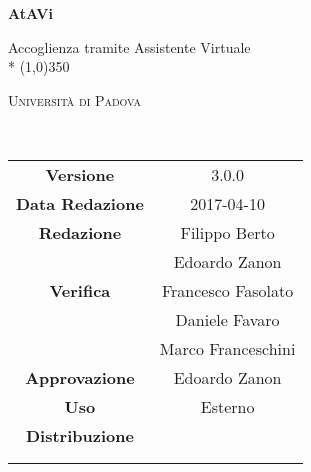 \documentclass[a4paper,12pt]{article}
\date{2017/04/10}
\begin{document}
	\begin{titlepage}
		\centering
		{\huge\bfseries AtAVi\par}
		Accoglienza tramite Assistente Virtuale \\*
		\line(1,0){350} \\
		{\scshape\LARGE Università di Padova \par}
		\vspace{1cm}
		{\scshape\Large \pianodiprogettoRQ\ \par}
		\logo
		\newpage
		\begin{tabular}{c|c}
			{\hfill \textbf{Versione}} 			& 3.0.0			\\ 
			{\hfill\textbf{Data Redazione}} 	& 2017-04-10 		\\ 
			{\hfill\textbf{Redazione}} 			& Filippo Berto \\ & Edoardo Zanon \\
			{\hfill\textbf{Verifica}} 			& Francesco Fasolato \\ & Daniele Favaro \\ & Marco Franceschini \\ 
			{\hfill\textbf{Approvazione}} 		& Edoardo Zanon \\
			{\hfill\textbf{Uso}} 				& Esterno 			\\
			{\hfill\textbf{Distribuzione}} 		& \vardanega \\ & \cardin \\ & \prop \\
		\end{tabular}
	\end{titlepage}
	
	\pagestyle{myfront}
	\newpage	
			

	\newpage
		\tableofcontents 	%
	\newpage
		\listoftables 		%
	\newpage	
		\listoffigures		%
	
	\label{LastFrontPage}
		\newpage
		\pagestyle{mymain}
		
			
		\newpage	
			
		\newpage			
			
		\newpage			
			
		\newpage			
			
		\newpage
			

	\label{LastPage}
\end{document}
